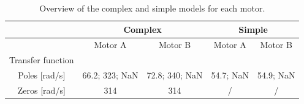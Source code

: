 \documentclass[a4paper,kul]{kulakarticle} %
\begin{document}
\begin{table}[htp]
	\centering
	\caption{Overview of the complex and simple models for each motor.}
	\label{tab:overview}
	\bgroup
	\def\arraystretch{1.8}
	\begin{tabular}{|c||cc||cc|}
		\hline & \multicolumn{2}{c||}{\textbf{Complex}} & \multicolumn{2}{c|}{\textbf{Simple}} 
		\\ \hline \hline
		& \multicolumn{1}{c|}{Motor A} & Motor B & \multicolumn{1}{c|}{Motor A} & Motor B
		\\ \hline
		Transfer function & \multicolumn{1}{c|}{\scalebox{1.15}{$\frac{0.6952\text{ }z + 0.7978}{z^3 - 0.04632\text{ }z^2 - 0.242\text{ }z}$}} & \scalebox{1.15}{$\frac{0.6901\text{ }z + 0.6834}{z^3 - 0.2128\text{ }z^2 - 0.1303\text{ }z}$} & \multicolumn{1}{c|}{\scalebox{1.15}{$\frac{ 0.8842}{z^2 - 0.5787\text{ }z}$}} & \scalebox{1.15}{$\frac{0.8832}{z^2 - 0.5778\text{ }z}$} 
		\\ \hline
		Poles [rad/s] & \multicolumn{1}{c|}{66.2; 323; NaN} & 72.8; 340; NaN & \multicolumn{1}{c|}{54.7; NaN} & 54.9; NaN
		\\ \hline
		Zeros [rad/s] & \multicolumn{1}{c|}{314} & 314 & \multicolumn{1}{c|}{/} & /
		\\ \hline
	\end{tabular}
	\egroup
\end{table}
\end{document}
